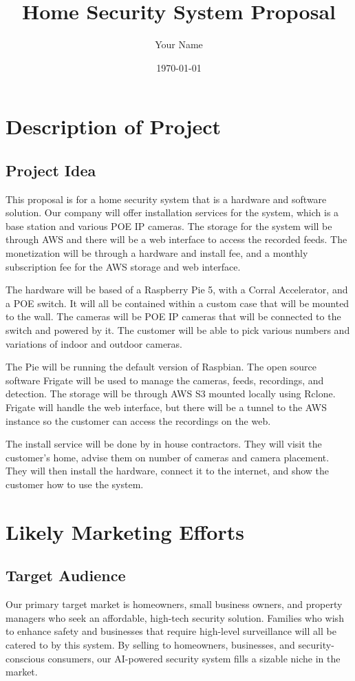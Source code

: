 \documentclass{report}
\title{Home Security System Proposal}
\author{Your Name}
\date{\today}
\begin{document}
\maketitle

\tableofcontents
\newpage

\chapter{Description of Project}
\section{Project Idea}
This proposal is for a home security system that is a hardware and software solution.
Our company will offer installation services for the system, which is a base station and various POE IP cameras.
The storage for the system will be through AWS and there will be a web interface to access the recorded feeds.
The monetization will be through a hardware and install fee, and a monthly subscription fee for the AWS storage and web interface.

The hardware will be based of a Raspberry Pie 5, with a Corral Accelerator, and a POE switch.
It will all be contained within a custom case that will be mounted to the wall.
The cameras will be POE IP cameras that will be connected to the switch and powered by it.
The customer will be able to pick various numbers and variations of indoor and outdoor cameras.

The Pie will be running the default version of Raspbian.
The open source software Frigate will be used to manage the cameras, feeds, recordings, and detection.
The storage will be through AWS S3 mounted locally using Rclone.
Frigate will handle the web interface, but there will be a tunnel to the AWS instance so the customer can access the recordings on the web.

The install service will be done by in house contractors.
They will visit the customer's home, advise them on number of cameras and camera placement.
They will then install the hardware, connect it to the internet, and show the customer how to use the system.


\chapter{Likely Marketing Efforts}
\section{Target Audience}
Our primary target market is homeowners, small business owners, and property managers who seek an affordable, high-tech security solution. 
Families who wish to enhance safety and businesses that require high-level surveillance will all be catered to by this system. 
By selling to homeowners, businesses, and security-conscious consumers, our AI-powered security system fills a sizable niche in the market. 
\end{document}
